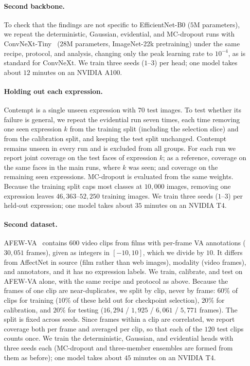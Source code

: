 \paragraph{Second backbone.} To check that the findings are not specific to
EfficientNet-B0 ($5$M parameters), we repeat the deterministic, Gaussian,
evidential, and MC-dropout runs with ConvNeXt-Tiny~\cite{liu2022convnet}
($28$M parameters, ImageNet-22k pretraining) under the same recipe, protocol,
and analysis, changing only the peak learning rate to $10^{-4}$, as is standard
for ConvNeXt. We train three seeds ($1$--$3$) per head; one model takes about
$12$ minutes on an NVIDIA A100.

\paragraph{Holding out each expression.} Contempt is a single unseen
expression with $70$ test images. To test whether its failure is general, we
repeat the evidential run seven times, each time removing one seen expression
$k$ from the training split (including the selection slice) and from the
calibration split, and keeping the test split unchanged. Contempt remains unseen
in every run and is excluded from all groups. For each run we report joint
coverage on the test faces of expression $k$; as a reference, coverage on the
same faces in the main runs, where $k$ was seen; and coverage on the remaining
seen expressions. MC-dropout is evaluated from the same weights. Because the
training split caps most classes at $10{,}000$ images, removing one expression
leaves $46{,}363$--$52{,}250$ training images. We train three seeds ($1$--$3$) per held-out
expression; one model takes about $35$ minutes on an
NVIDIA T4.

\paragraph{Second dataset.} AFEW-VA~\cite{kossaifi2017afew,dhall2012afew}
contains $600$ video clips from films with per-frame VA annotations
($30{,}051$ frames), given as integers in $[-10,10]$, which we divide by $10$. It
differs from AffectNet in source (film rather than web images), modality (video
frames), and annotators, and it has no expression labels. We train, calibrate,
and test on AFEW-VA alone, with the same recipe and protocol as above. Because
the frames of one clip are near-duplicates, we split by clip, never by frame:
$60\%$ of clips for training ($10\%$ of these held out for checkpoint selection),
$20\%$ for calibration, and $20\%$ for testing ($16{,}294$ / $1{,}925$ /
$6{,}061$ / $5{,}771$ frames). The split is fixed across seeds. Since frames
within a clip are correlated, we report coverage both per frame and averaged per
clip, so that each of the $120$ test clips counts once. We train the
deterministic, Gaussian, and evidential heads with three seeds each (MC-dropout
and three-member ensembles are formed from them as before); one model takes
about $45$ minutes on an NVIDIA T4.

